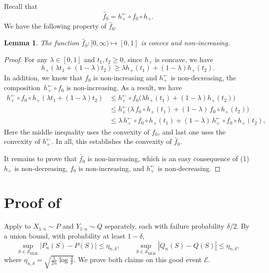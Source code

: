 \documentclass[english]{article}
\theoremstyle{plain}
\newtheorem{lemma}{Lemma}[section]
\theoremstyle{definition}
\newcommand{\hinv}{h_+^{\leftarrow}}
\newcommand{\fnull}{f_0}
\newcommand{\etaND}{\eta_{n,\delta}}               %
\newcommand{\hup}{h_+}                             %
\begin{document}
Recall that 
\[
\widetilde{\fnull} = \hinv\circ\fnull\circ\hup.
\]
We have the following property of $\widetilde{\fnull}$.

\begin{lemma}\label{lem:tilde-f}
    The function $\widetilde{\fnull} : [0,\infty) \mapsto [0,1]$ is convex and non-increasing. 
\end{lemma}

\begin{proof}
    For any $\lambda\in[0,1]$ and $t_1,t_2 \geqslant 0$, since $\hup$ is concave, we have
\[
\hup ( \lambda t_1+(1-\lambda) t_2 ) \geqslant \lambda\hup(t_1)+(1-\lambda)\hup(t_2).
\]
In addition, we know that $\fnull$ is non-increasing and $\hinv$ is non-decreasing, the composition~$\hinv \circ \fnull$ is non-increasing. 
As a result, we have 
\begin{align*}
\hinv\circ\fnull\circ\hup(\lambda t_1+(1-\lambda) t_2)
&\leqslant \hinv\circ\fnull\bigl(\lambda\hup(t_1)+(1-\lambda)\hup(t_2)\bigr)\\
&\leqslant \hinv\bigl(\lambda\,\fnull\circ\hup(t_1)+(1-\lambda)\,\fnull\circ\hup(t_2)\bigr)\\
&\leqslant \lambda\,\hinv\circ\fnull\circ\hup(t_1)+(1-\lambda)\,\hinv\circ\fnull\circ\hup(t_2),
\end{align*}
Here the middle inequality uses the convexity of $\fnull$, and last one uses the convexity of $\hinv$. 
In all, this establishes the convexity of $\widetilde{\fnull}$.

It remains to prove that $\widetilde{\fnull}$ is non-increasing, which is an easy consequence of (1) $\hup$ is non-decreasing, $\fnull$ is non-increasing, and $\hinv$ is non-decreasing.
\end{proof}


\section{Proof of }
\label{sec:proof-mlr}


Apply  to \(X_{1:n}\sim P\) and \(Y_{1:n}\sim Q\) separately,
each with failure probability \(\delta/2\). By a union bound, with probability at
least \(1-\delta\),
\begin{equation}
\label{eq:good-event-mlr}
\tag{\(\mathcal E\)}
\sup_{S\in\mathcal S_{\mathrm{MLR}}}| {P_n(S)-P(S)} |\leqslant \etaND,
\qquad
\sup_{S\in\mathcal S_{\mathrm{MLR}}}| {Q_n(S)-Q(S)} | \leqslant \etaND,
\end{equation}
where
$
\etaND
=
\sqrt{\frac{1}{2n}\log\frac{4}{\delta}}.
$
We prove both claims on this good event \(\mathcal E\).
\end{document}
